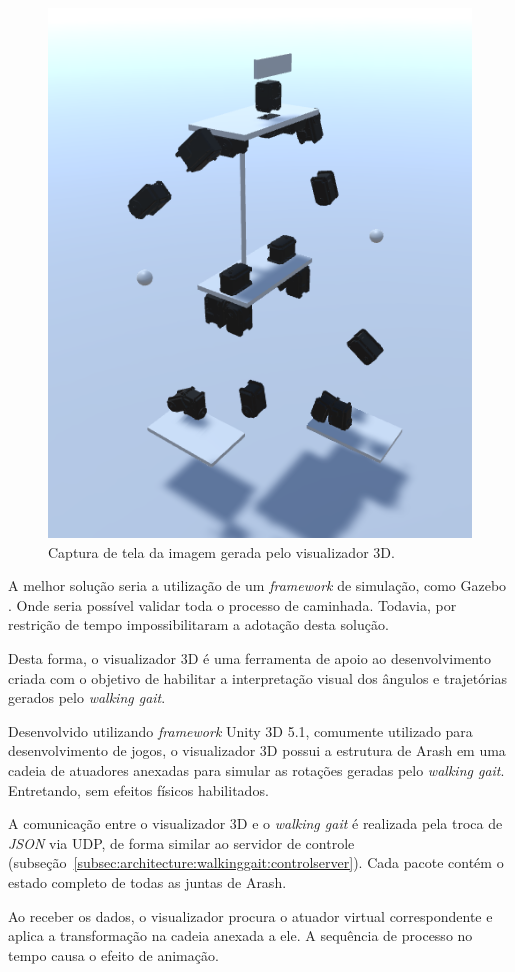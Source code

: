 \begin{figure}[htb]
	\centering
	\includegraphics[scale=0.4]{imagens/visualizador3d}
	\caption{Captura de tela da imagem gerada pelo visualizador 3D.}
	\label{fig:architecture:visualization:printscreen}
\end{figure}

A melhor solução seria a utilização de um \textit{framework} de simulação, como Gazebo \cite{gazebo}. Onde seria possível validar toda o processo de caminhada. Todavia, por restrição de tempo impossibilitaram a adotação desta solução. 

Desta forma, o visualizador 3D é uma ferramenta de apoio ao desenvolvimento criada com o objetivo de habilitar a interpretação visual dos ângulos e trajetórias gerados pelo \textit{walking gait}.

Desenvolvido utilizando \textit{framework} Unity 3D 5.1, comumente utilizado para desenvolvimento de jogos, o visualizador 3D possui a estrutura de Arash em uma cadeia de atuadores anexadas para simular as rotações geradas pelo \textit{walking gait}. Entretando, sem efeitos físicos habilitados.

A comunicação entre o visualizador 3D e o \textit{walking gait} é realizada pela troca de \textit{JSON} via UDP, de forma similar ao servidor de controle (subseção~\ref{subsec:architecture:walkinggait:controlserver}). Cada pacote contém o estado completo de todas as juntas de Arash.

Ao receber os dados, o visualizador procura o atuador virtual correspondente e aplica a transformação na cadeia anexada a ele. A sequência de processo no tempo causa o efeito de animação.